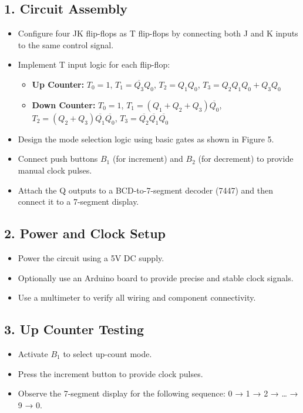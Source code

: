 \documentclass[12pt]{article}
\begin{document}
\subsection*{1. Circuit Assembly}
\begin{itemize}
    \item Configure four JK flip-flops as T flip-flops by connecting both J and K inputs to the same control signal.
    \item Implement T input logic for each flip-flop:
    \begin{itemize}
        \item \textbf{Up Counter:} $T_0 = 1$, $T_1 = \overline{Q_3}Q_0$, $T_2 = Q_1Q_0$, $T_3 = Q_2Q_1Q_0 + Q_3Q_0$
        \item \textbf{Down Counter:} $T_0 = 1$, $T_1 = (Q_1 + Q_2 + Q_3)\overline{Q_0}$, $T_2 = (Q_2 + Q_3)\overline{Q_1}\overline{Q_0}$, $T_3 = \overline{Q_2}\overline{Q_1}\overline{Q_0}$
    \end{itemize}
    \item Design the mode selection logic using basic gates as shown in Figure 5.
    \item Connect push buttons $B_1$ (for increment) and $B_2$ (for decrement) to provide manual clock pulses.
    \item Attach the Q outputs to a BCD-to-7-segment decoder (7447) and then connect it to a 7-segment display.
\end{itemize}

\subsection*{2. Power and Clock Setup}
\begin{itemize}
    \item Power the circuit using a 5V DC supply.
    \item Optionally use an Arduino board to provide precise and stable clock signals.
    \item Use a multimeter to verify all wiring and component connectivity.
\end{itemize}

\subsection*{3. Up Counter Testing}
\begin{itemize}
    \item Activate $B_1$ to select up-count mode.
    \item Press the increment button to provide clock pulses.
    \item Observe the 7-segment display for the following sequence: 0 → 1 → 2 → … → 9 → 0.
\end{itemize}
\end{document}
